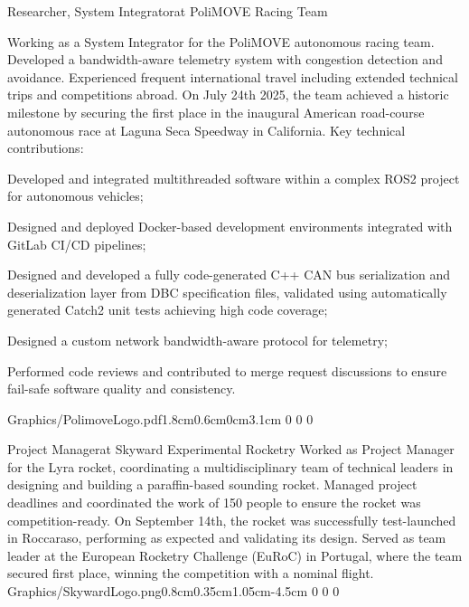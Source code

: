 \documentclass[10pt,onesize,a4paper,titlepage]{article}
\begin{document}
    \vspace{-1cm}
    \begin{tcolorbox}[grow to left by=0.55cm,colframe=white,colback=white]
        {Researcher, System Integrator}{at PoliMOVE Racing Team}
        {
            Working as a System Integrator for the PoliMOVE autonomous racing team. Developed a bandwidth-aware telemetry system with congestion detection and avoidance. Experienced frequent international travel including extended technical trips and competitions abroad. On July 24th 2025, the team achieved a historic milestone by securing the first place in the inaugural American road-course autonomous race at Laguna Seca Speedway in California.
            \newline
            \newline Key technical contributions:
            {
                \begin{compactitem}[-]
                    \item Developed and integrated multithreaded software within a complex ROS2 project for autonomous vehicles;
                    \item Designed and deployed Docker-based development environments integrated with GitLab CI/CD pipelines;
                    \item Designed and developed a fully code-generated C++ CAN bus serialization and deserialization layer from DBC specification files, validated using automatically generated Catch2 unit tests achieving high code coverage;
                    \item Designed a custom network bandwidth-aware protocol for telemetry;
                    \item Performed code reviews and contributed to merge request discussions to ensure fail-safe software quality and consistency.
                \end{compactitem}
            }
        }
        {Graphics/PolimoveLogo.pdf}{1.8cm}{0.6cm}{0cm}{3.1cm 0 0 0}
    \end{tcolorbox}
    \vspace{-0.75cm}
    \begin{tcolorbox}[grow to left by=0.55cm,colframe=white,colback=white]

        {Project Manager}{at Skyward Experimental Rocketry}
        {
            Worked as Project Manager for the Lyra rocket, coordinating a multidisciplinary team of technical leaders in designing and building a paraffin-based sounding rocket. Managed project deadlines and coordinated the work of 150 people to ensure the rocket was competition-ready. On September 14th, the rocket was successfully test-launched in Roccaraso, performing as expected and validating its design. Served as team leader at the European Rocketry Challenge (EuRoC) in Portugal, where the team secured first place, winning the competition with a nominal flight.
        }
        {Graphics/SkywardLogo.png}{0.8cm}{0.35cm}{1.05cm}{-4.5cm 0 0 0}
    \end{tcolorbox}
\end{document}
